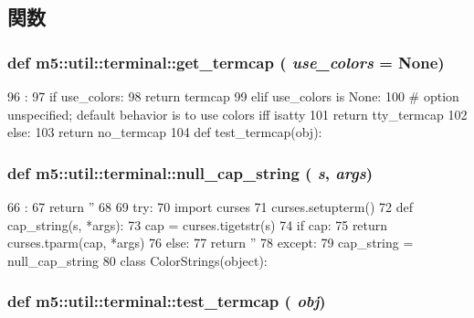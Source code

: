 \subsection{関数}
\hypertarget{namespacem5_1_1util_1_1terminal_ad0f951efed976bc4ff1432d7e0f22113}{
\subsubsection[{get\_\-termcap}]{\setlength{\rightskip}{0pt plus 5cm}def m5::util::terminal::get\_\-termcap ( {\em use\_\-colors} = {\ttfamily None})}}
\label{namespacem5_1_1util_1_1terminal_ad0f951efed976bc4ff1432d7e0f22113}



\begin{DoxyCode}
96                                   :
97     if use_colors:
98         return termcap
99     elif use_colors is None:
100         # option unspecified; default behavior is to use colors iff isatty
101         return tty_termcap
102     else:
103         return no_termcap
104 
def test_termcap(obj):
\end{DoxyCode}
\hypertarget{namespacem5_1_1util_1_1terminal_aedaa05021070716736cf092d2b8ad851}{
\subsubsection[{null\_\-cap\_\-string}]{\setlength{\rightskip}{0pt plus 5cm}def m5::util::terminal::null\_\-cap\_\-string ( {\em s}, \/   {\em args})}}
\label{namespacem5_1_1util_1_1terminal_aedaa05021070716736cf092d2b8ad851}



\begin{DoxyCode}
66                              :
67     return ''
68 
69 try:
70     import curses
71     curses.setupterm()
72     def cap_string(s, *args):
73         cap = curses.tigetstr(s)
74         if cap:
75             return curses.tparm(cap, *args)
76         else:
77             return ''
78 except:
79     cap_string = null_cap_string
80 
class ColorStrings(object):
\end{DoxyCode}
\hypertarget{namespacem5_1_1util_1_1terminal_aa89d63339c728f5244096532cadd9f2d}{
\subsubsection[{test\_\-termcap}]{\setlength{\rightskip}{0pt plus 5cm}def m5::util::terminal::test\_\-termcap ( {\em obj})}}
\label{namespacem5_1_1util_1_1terminal_aa89d63339c728f5244096532cadd9f2d}



